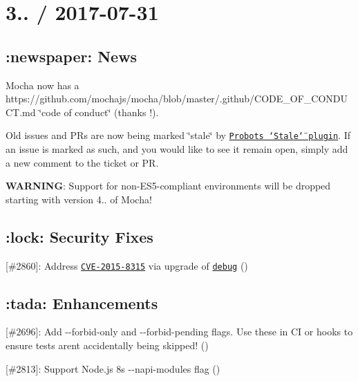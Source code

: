 \section*{3.. / 2017-\/07-\/31}

\subsection*{\+:newspaper\+: News}


\begin{DoxyItemize}
\item Mocha now has a https\+://github.com/mochajs/mocha/blob/master/.github/\+C\+O\+D\+E\+\_\+\+O\+F\+\_\+\+C\+O\+N\+D\+U\+C\+T.\+md \char`\"{}code of conduct\char`\"{} (thanks \href{https://github.com/kungapal}{\tt }!).
\item Old issues and P\+Rs are now being marked \char`\"{}stale\char`\"{} by \href{https://github.com/probot/stale}{\tt Probot\textquotesingle{}s \char`\"{}\+Stale\char`\"{} plugin}. If an issue is marked as such, and you would like to see it remain open, simply add a new comment to the ticket or PR.
\item {\bfseries W\+A\+R\+N\+I\+NG}\+: Support for non-\/\+E\+S5-\/compliant environments will be dropped starting with version 4.. of Mocha!
\end{DoxyItemize}

\subsection*{\+:lock\+: Security Fixes}


\begin{DoxyItemize}
\item \mbox{[}\#2860\mbox{]}\+: Address \href{https://nodesecurity.io/advisories/46}{\tt C\+V\+E-\/2015-\/8315} via upgrade of \href{https://npm.im/debug}{\tt debug} (\href{https://github.com/boneskull}{\tt })
\end{DoxyItemize}

\subsection*{\+:tada\+: Enhancements}


\begin{DoxyItemize}
\item \mbox{[}\#2696\mbox{]}\+: Add {\ttfamily -\/-\/forbid-\/only} and {\ttfamily -\/-\/forbid-\/pending} flags. Use these in CI or hooks to ensure tests aren\textquotesingle{}t accidentally being skipped! (\href{https://github.com/charlierudolph}{\tt })
\item \mbox{[}\#2813\mbox{]}\+: Support Node.\+js 8\textquotesingle{}s {\ttfamily -\/-\/napi-\/modules} flag (\href{https://github.com/jupp0r}{\tt })
\end{DoxyItemize}

